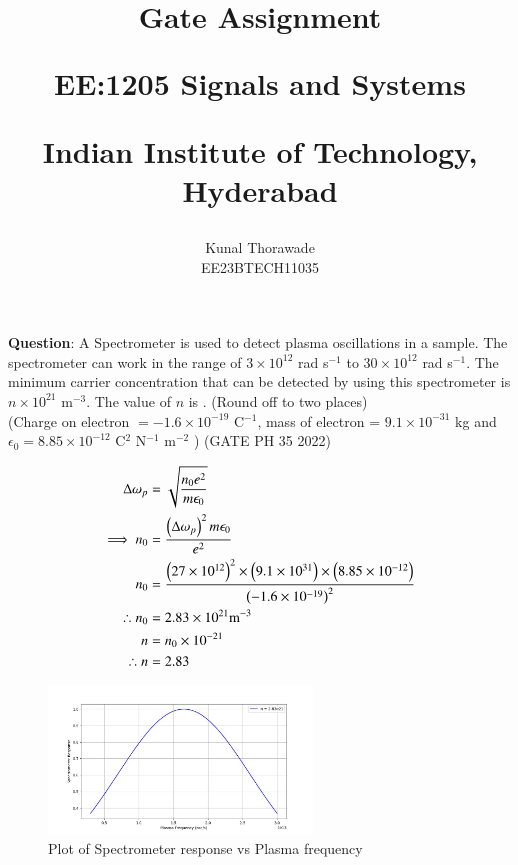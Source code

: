 \documentclass[journal,12pt,twocolumn]{IEEEtran}
\theoremstyle{remark}
\begin{document}
%




\vspace{3cm}

\title{
	Gate Assignment

	\large{EE:1205 Signals and Systems}

	Indian Institute of Technology, Hyderabad
}
\author{Kunal Thorawade

EE23BTECH11035
}	
\maketitle


\newpage


\bigskip
 
 \renewcommand{\thefigure}{\theenumi}
 \renewcommand{\thetable}{\arabic{table}}
 \renewcommand{\thefigure}{\arabic{figure}}

 \textbf{Question}:
 A Spectrometer is used to detect plasma oscillations in a sample. The spectrometer 
 can work in the range of $3 \times 10^{12}$ rad s$^{-1}$ to $30 \times 10^{12}$ rad s$^{-1}$. The minimum carrier concentration that can be detected by using this spectrometer is $n \times 10^{21}$ m$^{-3}$. The value of $n$ is \underline{\hspace{2cm}}. (Round off to two places) \\
 (Charge on electron $= -1.6 \times 10^{-19} $ C$^{-1}$, mass of electron = $9.1 \times 10^{-31}$ kg and $\epsilon_0 = 8.85 \times 10^{-12}$ C$^{2}$ N$^{-1}$ m$^{-2}$ ) \hfill(GATE PH 35 2022)\\
 \solution 
 
 \begin{align}
	     \Delta\omega_p &= \sqrt{\frac{n_0e^2}{m\epsilon_0}} \\
	         \implies n_0 &= \frac{\left(\Delta\omega_p\right)^2m\epsilon_0}{e^2} \\
		     n_0 &= \frac{\left(27 \times 10^{12}\right)^2 \times \left(9.1 \times 10^{31} \right)\times \left(8.85 \times 10^{-12}\right)}{\left(-1.6 \times 10^{-19}\right)^2} \\
		         \therefore n_0 &= 2.83 \times 10^{21} \text{m}^{-3} \\
			     n &= n_0 \times 10^{-21} \\
			         \therefore n &= 2.83
 \end{align}
 \begin{figure}[ht]
	     \centering
	         \includegraphics[width = 7cm]{figs/fig1.jpg}
		     \caption{Plot of Spectrometer response vs Plasma frequency}
		         \label{fig2.PH.35}
 \end{figure}
\end{document}
